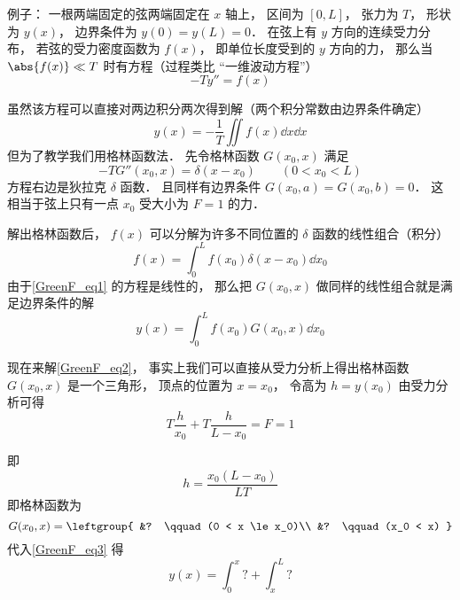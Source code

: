 
\begin{issues}
\issueDraft
\end{issues}


例子： 一根两端固定的弦两端固定在 $x$ 轴上， 区间为 $[0, L]$， 张力为 $T$， 形状为 $y(x)$， 边界条件为 $y(0) = y(L) = 0$． 在弦上有 $y$ 方向的连续受力分布， 若弦的受力密度函数为 $f(x)$， 即单位长度受到的 $y$ 方向的力， 那么当 $\abs{f(x)} \ll T$ 时有方程（过程类比 “一维波动方程”）
\begin{equation}\label{GreenF_eq1}
-T y'' = f(x)
\end{equation}

虽然该方程可以直接对两边积分两次得到解（两个积分常数由边界条件确定）
\begin{equation}
y(x) = -\frac{1}{T}\iint f(x) \dd{x}\dd{x}
\end{equation}
但为了教学我们用格林函数法． 先令格林函数 $G(x_0, x)$ 满足
\begin{equation}\label{GreenF_eq2}
-T G''(x_0, x) = \delta(x - x_0) \qquad (0 < x_0 < L)
\end{equation}
方程右边是狄拉克 $\delta$ 函数． 且同样有边界条件 $G(x_0, a) = G(x_0, b) = 0$． 这相当于弦上只有一点 $x_0$ 受大小为 $F = 1$ 的力．

解出格林函数后， $f(x)$ 可以分解为许多不同位置的 $\delta$ 函数的线性组合（积分）
\begin{equation}
f(x) = \int_0^L f(x_0) \delta(x - x_0) \dd{x_0}
\end{equation}
由于\autoref{GreenF_eq1} 的方程是线性的， 那么把 $G(x_0, x)$ 做同样的线性组合就是满足边界条件的解
\begin{equation}\label{GreenF_eq3}
y(x) = \int_0^L f(x_0) G(x_0, x) \dd{x_0}
\end{equation}

现在来解\autoref{GreenF_eq2}， 事实上我们可以直接从受力分析上得出格林函数 $G(x_0, x)$ 是一个三角形， 顶点的位置为 $x = x_0$， 令高为 $h = y(x_0)$ 由受力分析可得
\begin{equation}
T\frac{h}{x_0} + T\frac{h}{L - x_0} = F = 1
\end{equation}

即
\begin{equation}
h = \frac{x_0 (L - x_0)}{LT}
\end{equation}
即格林函数为
\begin{equation}
G(x_0, x) = \leftgroup{
&? \qquad (0 < x \le x_0)\\
&? \qquad (x_0 < x)
}\end{equation}
代入\autoref{GreenF_eq3} 得
\begin{equation}
y(x) = \int_0^x ? + \int_x^L ?
\end{equation}
